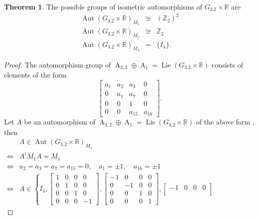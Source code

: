 \documentclass[12pt,a4paper,twoside]{article}
\theoremstyle{definition}
\newtheorem{theorem}{Theorem}[section]
\begin{document}
\begin{theorem} 
The possible groups of isometric automorphisms of $G_{3.2} \times \mathbb{R}$ are
\begin{eqnarray*}
\operatorname{Aut}\left(G_{3.2} \times \mathbb{R}\right)_{M_1}  &\cong& \left(\mathbb{Z}_2\right)^2\\
\operatorname{Aut}\left(G_{3.2} \times \mathbb{R}\right)_{M_2}  &\cong& \mathbb{Z}_2\\
\operatorname{Aut}\left(G_{3.2} \times \mathbb{R}\right)_{M_3}  &=& \{I_4\}.
\end{eqnarray*}
\end{theorem}
\begin{proof}
The automorphism group of $\operatorname{A}_{3, 2} \oplus \operatorname{A}_1 = \operatorname{Lie}(G_{3.2} \times \mathbb{R})$ consists of elements of the form \cite{christodoulakis2003automorphisms}
$$\begin{bmatrix}
a_1 & a_2 & a_3 & 0\\
0 & a_1 & a_7 & 0\\
0 & 0 & 1 & 0\\
0 & 0 & a_{15} & a_{16}
\end{bmatrix}.$$
Let $A$ be an automorphism of $\operatorname{A}_{3, 2} \oplus \operatorname{A}_1 = \operatorname{Lie}(G_{3.2} \times \mathbb{R})$ of the above form , then
\begin{eqnarray*}
& A \in \operatorname{Aut}\left(G_{3.2} \times \mathbb{R}\right)_{M_1}\hspace{10cm}\\ \Leftrightarrow & A^tM_1A = M_1\hspace{11cm}\\
\Leftrightarrow & a_2 = a_3 = a_7 = a_{15} = 0, \quad a_1 = \pm 1, \quad a_{16} = \pm 1 \hspace{5cm}\\
\Leftrightarrow & A \in \left\lbrace I_4, \begin{bmatrix}
1 & 0 & 0 & 0\\
0 & 1 & 0 & 0\\
0 & 0 & 1 & 0\\
0 & 0 & 0 & -1
\end{bmatrix}, \begin{bmatrix}
-1 & 0 & 0 & 0\\
0 & -1 & 0 & 0\\
0 & 0 & 1 & 0\\
0 & 0 & 0 & 1
\end{bmatrix}, \begin{bmatrix}
-1 & 0 & 0 & 0\\

\end{bmatrix}
\end{eqnarray*}
\end{proof}
\end{document}
